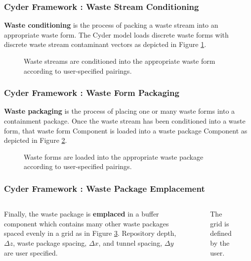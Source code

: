 \begin{frame}[ctb!]
  \frametitle{Cyder Framework : Waste Stream Conditioning}
  \footnotesize{

    \textbf{Waste conditioning} is the process of packing a waste stream into an appropriate 
waste form.  The Cyder model loads discrete waste forms with discrete waste 
stream contaminant vectors as depicted in Figure \ref{fig:ws_conditioning}.
  
\begin{figure}[htbp!]
\begin{center}
\def\svgwidth{.5\textwidth}

\end{center}
\caption{Waste streams are conditioned into the appropriate waste form 
according to user-specified pairings.}
\label{fig:ws_conditioning}
\end{figure}
}
\end{frame}

\begin{frame}[ctb!]
  \frametitle{Cyder Framework : Waste Form Packaging}
  \footnotesize{

    \textbf{Waste packaging} is the process of placing one or many waste forms into a 
containment package. Once the waste stream has been conditioned into a waste 
form, that waste form Component is loaded into a waste package Component as 
depicted in Figure \ref{fig:wf_packaging}.  

\begin{figure}[htbp!]
\begin{center}
\def\svgwidth{.5\textwidth}

\end{center}
\caption{Waste forms are loaded into the appropriate waste package 
according to user-specified pairings.}
\label{fig:wf_packaging}
\end{figure}
}
\end{frame}

\begin{frame}[ctb!]
  \frametitle{Cyder Framework : Waste Package Emplacement}
  \footnotesize{
  
\begin{columns}[c]
  Finally, the waste package is \textbf{emplaced} in a buffer component which 
contains many other waste packages spaced evenly in a grid as in Figure 
\ref{fig:repo_layout}. Repository depth, $\Delta z$, waste package spacing, 
$\Delta x$, and tunnel spacing, $\Delta y$ are user specified.


\begin{figure}[htbp!]
\begin{center}
\def\svgwidth{.5\textwidth}

\end{center}
\caption{ The grid is defined by the user.  }
\label{fig:repo_layout}
\end{figure}
\end{columns}

}
\end{frame}


